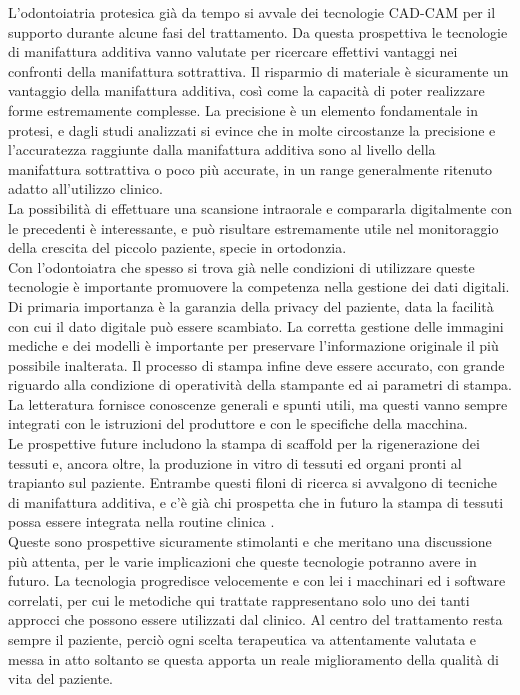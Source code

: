 L'odontoiatria protesica già da tempo si avvale dei tecnologie CAD-CAM per il supporto durante alcune fasi del trattamento. Da questa prospettiva le tecnologie di manifattura additiva vanno valutate per ricercare effettivi vantaggi nei confronti della manifattura sottrattiva. Il risparmio di materiale è sicuramente un vantaggio della manifattura additiva, così come la capacità di poter realizzare forme estremamente complesse. La precisione è un elemento fondamentale in protesi, e dagli studi analizzati si evince che in molte circostanze la precisione e l'accuratezza raggiunte dalla manifattura additiva sono al livello della manifattura sottrattiva o poco più accurate, in un range generalmente ritenuto adatto all'utilizzo clinico. \\
La possibilità di effettuare una scansione intraorale e compararla digitalmente con le precedenti è interessante, e può risultare estremamente utile nel monitoraggio della crescita del piccolo paziente, specie in ortodonzia.\\
Con l'odontoiatra che spesso si trova già nelle condizioni di utilizzare queste tecnologie è importante promuovere la competenza nella gestione dei dati digitali. Di primaria importanza è la garanzia della privacy del paziente, data la facilità con cui il dato digitale può essere scambiato. La corretta gestione delle immagini mediche e dei modelli è importante per preservare l'informazione originale il più possibile inalterata. Il processo di stampa infine deve essere accurato, con grande riguardo alla condizione di operatività della stampante ed ai parametri di stampa. La letteratura fornisce conoscenze generali e spunti utili, ma questi vanno sempre integrati con le istruzioni del produttore e con le specifiche della macchina.\\
Le prospettive future includono la stampa di scaffold per la rigenerazione dei tessuti e, ancora oltre, la produzione in vitro di tessuti ed organi pronti al trapianto sul paziente. Entrambe questi filoni di ricerca si avvalgono di tecniche di manifattura additiva, e c'è già chi prospetta che in futuro la stampa di tessuti possa essere integrata nella routine clinica \parencite{Reference142}.\\
Queste sono prospettive sicuramente stimolanti e che meritano una discussione più attenta, per le varie implicazioni che queste tecnologie potranno avere in futuro. La tecnologia progredisce velocemente e con lei i macchinari ed i software correlati, per cui le metodiche qui trattate rappresentano solo uno dei tanti approcci che possono essere utilizzati dal clinico. Al centro del trattamento resta sempre il paziente, perciò ogni scelta terapeutica va attentamente valutata e messa in atto soltanto se questa apporta un reale miglioramento della qualità di vita del paziente.
